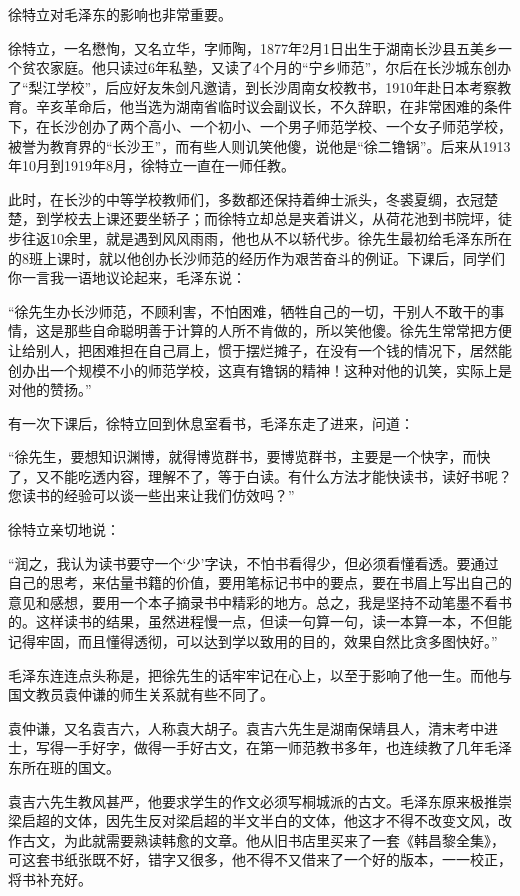 \documentclass[../../dazhuan.tex]{subfiles}
\begin{document}
徐特立对毛泽东的影响也非常重要。

徐特立，一名懋恂，又名立华，字师陶，1877年2月1日出生于湖南长沙县五美乡一个贫农家庭。他只读过6年私塾，又读了4个月的“宁乡师范”，尔后在长沙城东创办了“梨江学校”，后应好友朱剑凡邀请，到长沙周南女校教书，1910年赴日本考察教育。辛亥革命后，他当选为湖南省临时议会副议长，不久辞职，在非常困难的条件下，在长沙创办了两个高小、一个初小、一个男子师范学校、一个女子师范学校，被誉为教育界的“长沙王”，而有些人则讥笑他傻，说他是“徐二镥锅”。后来从1913年10月到1919年8月，徐特立一直在一师任教。

此时，在长沙的中等学校教师们，多数都还保持着绅士派头，冬裘夏绸，衣冠楚楚，到学校去上课还要坐轿子；而徐特立却总是夹着讲义，从荷花池到书院坪，徒步往返10余里，就是遇到风风雨雨，他也从不以轿代步。徐先生最初给毛泽东所在的8班上课时，就以他创办长沙师范的经历作为艰苦奋斗的例证。下课后，同学们你一言我一语地议论起来，毛泽东说：

“徐先生办长沙师范，不顾利害，不怕困难，牺牲自己的一切，干别人不敢干的事情，这是那些自命聪明善于计算的人所不肯做的，所以笑他傻。徐先生常常把方便让给别人，把困难担在自己肩上，惯于摆烂摊子，在没有一个钱的情况下，居然能创办出一个规模不小的师范学校，这真有镥锅的精神！这种对他的讥笑，实际上是对他的赞扬。”

有一次下课后，徐特立回到休息室看书，毛泽东走了进来，问道：

“徐先生，要想知识渊博，就得博览群书，要博览群书，主要是一个快字，而快了，又不能吃透内容，理解不了，等于白读。有什么方法才能快读书，读好书呢？您读书的经验可以谈一些出来让我们仿效吗？”

徐特立亲切地说：

“润之，我认为读书要守一个‘少’字诀，不怕书看得少，但必须看懂看透。要通过自己的思考，来估量书籍的价值，要用笔标记书中的要点，要在书眉上写出自己的意见和感想，要用一个本子摘录书中精彩的地方。总之，我是坚持不动笔墨不看书的。这样读书的结果，虽然进程慢一点，但读一句算一句，读一本算一本，不但能记得牢固，而且懂得透彻，可以达到学以致用的目的，效果自然比贪多图快好。”

毛泽东连连点头称是，把徐先生的话牢牢记在心上，以至于影响了他一生。而他与国文教员袁仲谦的师生关系就有些不同了。

袁仲谦，又名袁吉六，人称袁大胡子。袁吉六先生是湖南保靖县人，清末考中进士，写得一手好字，做得一手好古文，在第一师范教书多年，也连续教了几年毛泽东所在班的国文。

袁吉六先生教风甚严，他要求学生的作文必须写桐城派的古文。毛泽东原来极推崇梁启超的文体，因先生反对梁启超的半文半白的文体，他这才不得不改变文风，改作古文，为此就需要熟读韩愈的文章。他从旧书店里买来了一套《韩昌黎全集》，可这套书纸张既不好，错字又很多，他不得不又借来了一个好的版本，一一校正，将书补充好。
\end{document}
